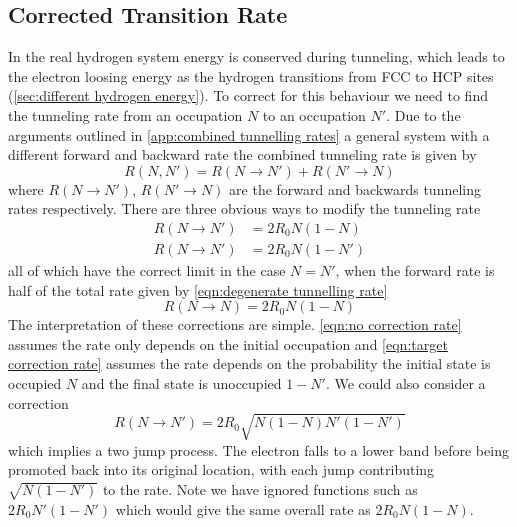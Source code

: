 \subsection{Corrected Transition Rate}\label{sec:corrected transition rate}
In the real hydrogen
system energy is conserved
during tunneling,
which leads
to the electron loosing energy
as the hydrogen transitions from
FCC to HCP sites
(\cref{sec:different hydrogen energy}).
To correct for this behaviour
we need to find the tunneling
rate from an occupation \(N\)
to an occupation \(N'\).
Due to
the arguments outlined in
\cref{app:combined tunnelling rates}
a general system with a different
forward and backward rate the
combined tunneling rate is
given by
\begin{equation}
    R(N,N') = R(N\rightarrow{}N') + R(N'\rightarrow{}N)
\end{equation}
where \(R(N\rightarrow{}N')\), \(R(N'\rightarrow{}N)\)
are the forward and backwards
tunneling rates respectively.
There are
three obvious ways to modify the tunneling
rate
\begin{align}
    R(N\rightarrow{}N') & = 2R_0N(1-N)           \label{eqn:no correction rate}     \\
    R(N\rightarrow{}N') & = 2R_0N(1-N')          \label{eqn:target correction rate}
\end{align}
all of which have the correct
limit in the case \(N=N'\),
when the forward rate is half
of the total rate given
by \cref{eqn:degenerate tunnelling rate}
\begin{equation}
    R(N\rightarrow{}N) = 2R_0N(1-N)
\end{equation}
The interpretation of these
corrections are
simple. \cref{eqn:no correction rate}
assumes the rate only depends
on the initial occupation and
\cref{eqn:target correction rate} assumes the rate
depends on the probability the
initial state is occupied
\(N\) and the final state
is unoccupied \(1-N'\). We could
also consider a correction
\begin{equation}
    R(N\rightarrow{}N') = 2R_0 \sqrt{N(1-N)N'(1-N')} \label{eqn:two hop correction}
\end{equation}
which implies a two jump process.
The electron falls to a lower band
before being promoted back into
its original location, with
each jump contributing \(\sqrt{N(1-N')}\)
to the rate. Note we have ignored functions
such as \(2R_0N'(1-N')\) which
would give the same overall rate
as \(2R_0N(1-N)\).

